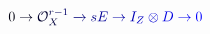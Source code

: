 \documentclass[12pt]{article}
\begin{document}
\makeatletter
\renewcommand*{\@textcolor}[3]{%
  \protect\leavevmode
  \begingroup
    \color#1{#2}#3%
  \endgroup
}
\makeatother
\begin{displaymath}
\mathcolor[RGB]{0,0,15}{0} \mathcolor[RGB]{0,0,30}{\rightarrow} \mathcal { \mathcolor[RGB]{0,0,45}{O} } _ { \mathcolor[RGB]{0,0,60}{X} } ^ { \mathcolor[RGB]{0,0,75}{r} \mathcolor[RGB]{0,0,90}{-} \mathcolor[RGB]{0,0,105}{1} } \mathcolor[RGB]{0,0,120}{\xrightarrow{} \mathcolor[RGB]{0,0,135}{s} } \mathcolor[RGB]{0,0,150}{E} \mathcolor[RGB]{0,0,165}{\rightarrow} \mathcolor[RGB]{0,0,180}{I} _ { \mathcolor[RGB]{0,0,195}{Z} } \mathcolor[RGB]{0,0,210}{\otimes} \mathcolor[RGB]{0,0,225}{D} \mathcolor[RGB]{0,0,240}{\rightarrow} \mathcolor[RGB]{0,0,255}{0}
\end{displaymath}
\end{document}
